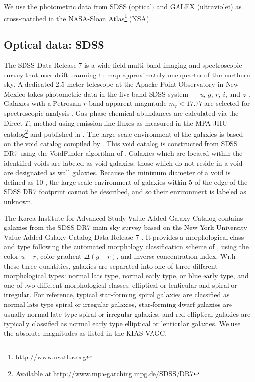 We use the photometric data from SDSS (optical) and GALEX (ultraviolet) as 
cross-matched in the NASA-Sloan Atlas\footnote{\url{http://www.nsatlas.org}} 
(NSA).

\subsection{Optical data: SDSS}\label{sec:SDSS}

The SDSS Data Release 7 \citep[DR7;][]{Abazajian09} is a wide-field multi-band 
imaging and spectroscopic survey that uses drift scanning to map approximately 
one-quarter of the northern sky.  A dedicated 2.5-meter telescope at the Apache 
Point Observatory in New Mexico takes photometric data in the five-band SDSS 
system --- $u$, $g$, $r$, $i$, and $z$ \citep{Fukugita96,Gunn98}.  Galaxies with 
a Petrosian $r$-band apparent magnitude $m_r < 17.77$ are selected for 
spectroscopic analysis \citep{Lupton01,Strauss02}.  Gas-phase chemical 
abundances are calculated via the Direct $T_e$ method using emission-line fluxes 
as measured in the MPA-JHU catalog\footnote{Available at 
\url{http://www.mpa-garching.mpg.de/SDSS/DR7}} and published in 
\cite{Douglass17c}.  The large-scale environment of the galaxies is based on the 
void catalog compiled by \cite{Pan12}.  This void catalog is constructed from 
SDSS DR7 using the VoidFinder algorithm of \cite{Hoyle02}.  Galaxies which are 
located within the identified voids are labeled as void galaxies; those which do 
not reside in a void are designated as wall galaxies.  Because the minimum 
diameter of a void is defined as 10 \hMpc , the large-scale environment of 
galaxies within 5 \hMpc of the edge of the SDSS DR7 footprint cannot be 
described, and so their environment is labeled as unknown.

The Korea Institute for Advanced Study Value-Added Galaxy Catalog 
\citep[KIAS-VAGC;][]{Choi10} contains galaxies from the SDSS DR7 main sky survey 
based on the New York University Value-Added Galaxy Catalog Data Release 7 
\citep[NYU-VAGC;][]{Blanton05}.  It provides a morphological class and type 
following the automated morphology classification scheme of \cite{Park05}, using 
the color $u-r$, color gradient $\Delta (g-r)$, and inverse concentration index.  
With these three quantities, galaxies are separated into one of three different 
morphological types: normal late type, normal early type, or blue early type, 
and one of two different morphological classes: elliptical or lenticular and 
spiral or irregular.  For reference, typical star-forming spiral galaxies are 
classified as normal late type spiral or irregular galaxies, star-forming dwarf 
galaxies are usually normal late type spiral or irregular galaxies, and red 
elliptical galaxies are typically classified as normal early type elliptical or 
lenticular galaxies.  We use the absolute magnitudes as listed in the KIAS-VAGC.

